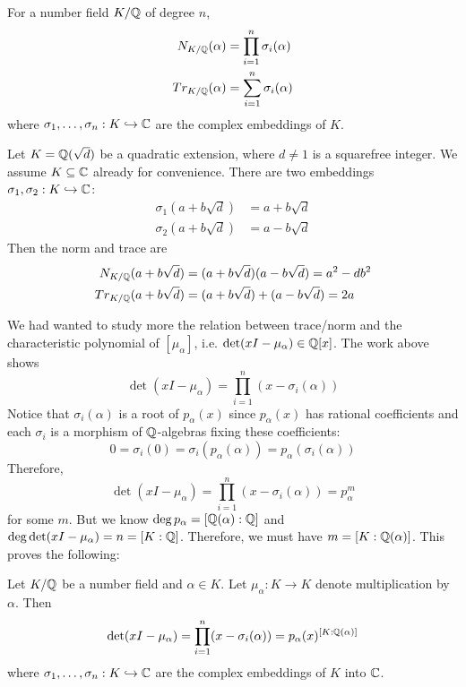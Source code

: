 \begin{prop}
For a number field $K/\mathbb{Q}$ of degree $n$,
	\[
	\begin{split}
	N_{K/\mathbb{Q}}(\alpha)&= \prod_{i=1}^n \sigma_i(\alpha) \\
	Tr_{K/\mathbb{Q}}(\alpha)&= \sum_{i=1}^n \sigma_i(\alpha)
	\end{split}
	\]
where $\sigma_1,\ldots,\sigma_n: K \hookrightarrow \mathbb{C}$ are the complex embeddings of $K$.
\end{prop}

\begin{ex}
Let $K=\mathbb{Q}(\sqrt{d})$ be a quadratic extension, where $d \neq 1$ is a squarefree integer. We assume $K \subseteq \mathbb{C}$ already for convenience. There are two embeddings $\sigma_1,\sigma_2: K \hookrightarrow \mathbb{C}$:
	\[
	\begin{split}
	\sigma_1(a+b\sqrt{d})&= a+b\sqrt{d} \\
	\sigma_2(a+b\sqrt{d})&= a-b\sqrt{d}
	\end{split}
	\]
Then the norm and trace are
	\[
	\begin{split}
	N_{K/\mathbb{Q}}(a+b\sqrt{d})&= (a+b\sqrt{d})(a-b\sqrt{d})= a^2-db^2 \\
	Tr_{K/\mathbb{Q}}(a+b\sqrt{d})&= (a+b\sqrt{d}) + (a-b\sqrt{d})= 2a
	\end{split}
	\] \xqed
\end{ex}


We had wanted to study more the relation between trace/norm and the characteristic polynomial of $[\mu_\alpha]$, i.e. $\det(xI-\mu_\alpha) \in \mathbb{Q}[x]$. The work above shows
	\[
	\det(xI - \mu_\alpha)= \prod_{i=1}^n (x - \sigma_i(\alpha))
	\]
Notice that $\sigma_i(\alpha)$ is a root of $p_\alpha(x)$ since $p_\alpha(x)$ has rational coefficients and each $\sigma_i$ is a morphism of $\mathbb{Q}$-algebras fixing these coefficients:
	\[
	0=\sigma_i(0)=\sigma_i(p_\alpha(\alpha))=p_\alpha(\sigma_i(\alpha))
	\]
Therefore,
	\[
	\det(xI - \mu_\alpha)= \prod_{i=1}^n (x - \sigma_i(\alpha))= p_\alpha^m
	\]
for some $m$. But we know $\deg p_\alpha=[\mathbb{Q}(\alpha):\mathbb{Q}]$ and $\deg \det(xI - \mu_\alpha)=n=[K:\mathbb{Q}]$. Therefore, we must have $m=[K:\mathbb{Q}(\alpha)]$. This proves the following:

\begin{prop}\label{prop:mult}
Let $K/\mathbb{Q}$ be a number field and $\alpha \in K$. Let $\mu_\alpha: K \to K$ denote multiplication by $\alpha$. Then
	\[
	\det(xI - \mu_\alpha)= \prod_{i=1}^n (x - \sigma_i(\alpha))= p_\alpha(x)^{[K:\mathbb{Q}(\alpha)]}
	\]
where $\sigma_1,\ldots,\sigma_n: K \hookrightarrow \mathbb{C}$ are the complex embeddings of $K$ into $\mathbb{C}$.
\end{prop}

